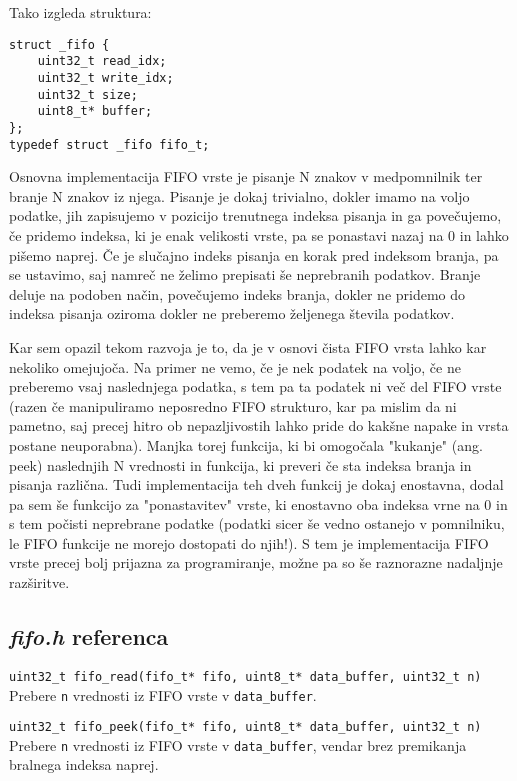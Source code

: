 \documentclass[12pt,a4paper,twoside,openright,slovene]{book}
\begin{document}
Tako izgleda struktura:
\begin{lstlisting}
struct _fifo {
    uint32_t read_idx;
    uint32_t write_idx;
    uint32_t size;
    uint8_t* buffer;
};
typedef struct _fifo fifo_t;
\end{lstlisting}

Osnovna implementacija FIFO vrste je pisanje N znakov v medpomnilnik ter branje N znakov iz njega. Pisanje je dokaj trivialno, dokler imamo na voljo podatke, jih zapisujemo v pozicijo trenutnega indeksa pisanja in ga povečujemo, če pridemo indeksa, ki je enak velikosti vrste, pa se ponastavi nazaj na 0 in lahko pišemo naprej. Če je slučajno indeks pisanja en korak pred indeksom branja, pa se ustavimo, saj namreč ne želimo prepisati še neprebranih podatkov. Branje deluje na podoben način, povečujemo indeks branja, dokler ne pridemo do indeksa pisanja oziroma dokler ne preberemo željenega števila podatkov.

Kar sem opazil tekom razvoja je to, da je v osnovi čista FIFO vrsta lahko kar nekoliko omejujoča. Na primer ne vemo, če je nek podatek na voljo, če ne preberemo vsaj naslednjega podatka, s tem pa ta podatek ni več del FIFO vrste (razen če manipuliramo neposredno FIFO strukturo, kar pa mislim da ni pametno, saj precej hitro ob nepazljivostih lahko pride do kakšne napake in vrsta postane neuporabna). Manjka torej funkcija, ki bi omogočala "kukanje" (ang. peek) naslednjih N vrednosti in funkcija, ki preveri če sta indeksa branja in pisanja različna. Tudi implementacija teh dveh funkcij je dokaj enostavna, dodal pa sem še funkcijo za "ponastavitev" vrste, ki enostavno oba indeksa vrne na 0 in s tem počisti neprebrane podatke (podatki sicer še vedno ostanejo v pomnilniku, le FIFO funkcije ne morejo dostopati do njih!). S tem je implementacija FIFO vrste precej bolj prijazna za programiranje, možne pa so še raznorazne nadaljnje razširitve.



\subsection{\textit{fifo.h} referenca}

\lstinline{uint32_t fifo_read(fifo_t* fifo, uint8_t* data_buffer, uint32_t n)}\newline
Prebere \lstinline{n} vrednosti iz FIFO vrste v \lstinline{data_buffer}.

\lstinline{uint32_t fifo_peek(fifo_t* fifo, uint8_t* data_buffer, uint32_t n)}\newline
Prebere \lstinline{n} vrednosti iz FIFO vrste v \lstinline{data_buffer}, vendar brez premikanja bralnega indeksa naprej.
\end{document}
